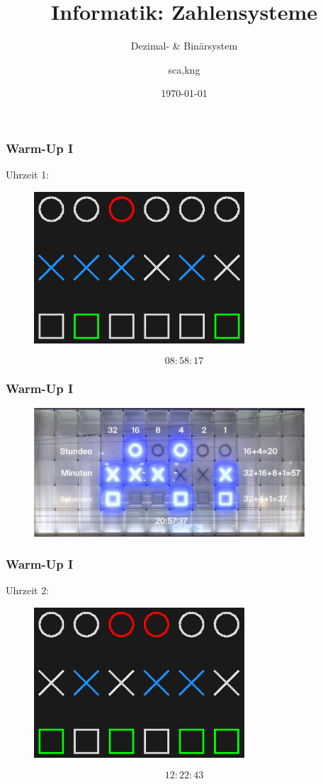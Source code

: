 \documentclass{beamer}
\title{Informatik: Zahlensysteme}
\subtitle{Dezimal- \& Binärsystem}
\author{sca,kng}
\institute{KSR}
\date{\today}
\begin{document}
\begin{frame}
    \titlepage
\end{frame}

\begin{frame}
    \frametitle{Warm-Up I}
    Uhrzeit 1:
    \begin{figure}[H]
        \centering
        \includegraphics[width=0.7\textwidth]{08_58_17_dark}
    \end{figure}
     $$08:58:17$$
\end{frame}

\begin{frame}
    \frametitle{Warm-Up I}
    \begin{figure}[H]
        \centering
        \includegraphics[width=0.9\textwidth]{binary_clock_read_help}
    \end{figure}
\end{frame}

\begin{frame}
    \frametitle{Warm-Up I}
    Uhrzeit 2:
    \begin{figure}[H]
        \centering
        \includegraphics[width=0.7\textwidth]{12_22_43_dark}
    \end{figure}
     $$12:22:43$$
\end{frame}
\end{document}
